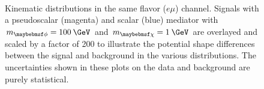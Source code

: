 \begin{figure}
  \centering
   \\ 
  \caption{Kinematic distributions in the same flavor ($e\mu$) channel. Signals with a pseudoscalar (magenta) and scalar (blue) mediator with $\mMed=100\:\GeV$ and $\mDM=1\:\GeV$ are overlayed and scaled by a factor of 200 to illustrate the potential shape differences between the signal and background in the various distributions. The uncertainties shown in these plots on the data and background are purely statistical.}
  \label{fig:dilep_sr_em}
\end{figure}

